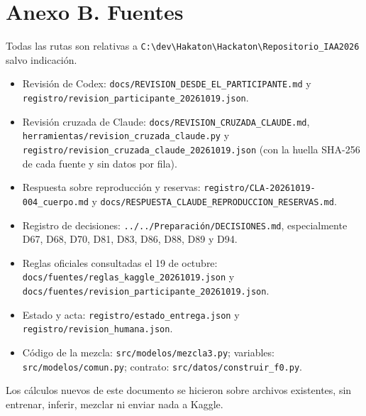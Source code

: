 \documentclass[11pt,a4paper]{article}
\newcommand{\archivo}[1]{\texttt{\small #1}}
\begin{document}
\section{Anexo B. Fuentes}
{\raggedright\sloppy

Todas las rutas son relativas a \archivo{C:\textbackslash dev\textbackslash Hakaton\textbackslash Hackaton\textbackslash Repositorio\_IAA2026} salvo indicación.

\begin{itemize}
\item Revisión de Codex: \archivo{docs/REVISION\_DESDE\_EL\_PARTICIPANTE.md} y \archivo{registro/revision\_participante\_20261019.json}.
\item Revisión cruzada de Claude: \archivo{docs/REVISION\_CRUZADA\_CLAUDE.md}, \archivo{herramientas/revision\_cruzada\_claude.py} y \archivo{registro/revision\_cruzada\_claude\_20261019.json} (con la huella SHA-256 de cada fuente y sin datos por fila).
\item Respuesta sobre reproducción y reservas: \archivo{registro/CLA-20261019-004\_cuerpo.md} y \archivo{docs/RESPUESTA\_CLAUDE\_REPRODUCCION\_RESERVAS.md}.
\item Registro de decisiones: \archivo{../../Preparación/DECISIONES.md}, especialmente D67, D68, D70, D81, D83, D86, D88, D89 y D94.
\item Reglas oficiales consultadas el 19 de octubre: \archivo{docs/fuentes/reglas\_kaggle\_20261019.json} y \archivo{docs/fuentes/revision\_participante\_20261019.json}.
\item Estado y acta: \archivo{registro/estado\_entrega.json} y \archivo{registro/revision\_humana.json}.
\item Código de la mezcla: \archivo{src/modelos/mezcla3.py}; variables: \archivo{src/modelos/comun.py}; contrato: \archivo{src/datos/construir\_f0.py}.
\end{itemize}

Los cálculos nuevos de este documento se hicieron sobre archivos existentes, sin entrenar, inferir, mezclar ni enviar nada a Kaggle.\par}
\end{document}
